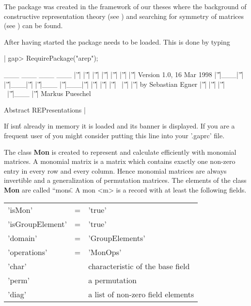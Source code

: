 The package {\AREP} was created in the framework of our theses where
the background of constructive representation theory (see
\cite{Pue99}) and searching for symmetry of matrices (see
\cite{Egn97}) can be found.


After having started {\GAP} the {\AREP} package needs to be 
loaded. This is done by typing\:

\renewcommand{\baselinestretch}{0.8}
|    gap> RequirePackage("arep");

                 ___   ___   ___  ___   
                |'\|'|   |'\|'| |'\|'|   |'\|'| |'\|'|    |'\|'|   |'\|'|   Version 1.0, 16 Mar 1998
                |'\|'|___|'\|'| |'\|'|___|'\|'| |'\|'|___ |'\|'|___|'\|'|
                |'\|'|   |'\|'| |'\|'|  \  |'\|'|    |'\|'|       by Sebastian Egner
                |'\|'|   |'\|'| |'\|'|   \ |'\|'|___ |'\|'|          Markus Pueschel

               Abstract REPresentations |

\renewcommand{\baselinestretch}{1}

%
%

If {\AREP} isn\'t already in memory it is loaded and its 
banner is displayed. If you are a frequent user of {\AREP} 
you might consider putting this line into your '.gaprc' file.

The class {\bf Mon} is created to represent and calculate
efficiently with monomial matrices. A monomial matrix is a
matrix which contains exactly one non-zero entry in every
row and every column. Hence monomial matrices are always invertible 
and a generalization of permutation matrices. The elements
of the class {\bf Mon} are called ``mons\". A mon <m> is a 
record with at least the following fields.

\begin{center}
\begin{tabular}{lll}
'isMon'          & \:= & 'true'\\
'isGroupElement' & \:= & 'true'\\
'domain'         & \:= & 'GroupElements'\\
'operations'     & \:= & 'MonOps'\\
'char'           & \: & characteristic of the base field\\
'perm'           & \: & a permutation\\
'diag'           & \: & a list of non-zero field elements
\end{tabular}    
\end{center}


